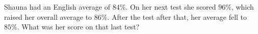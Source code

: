 Shauna had an English average of $84\%$. On her next test she scored $96\%$, which raised her overall average to $86\%$. After the test after that, her average fell to $85\%$. What was her score on that last test?
